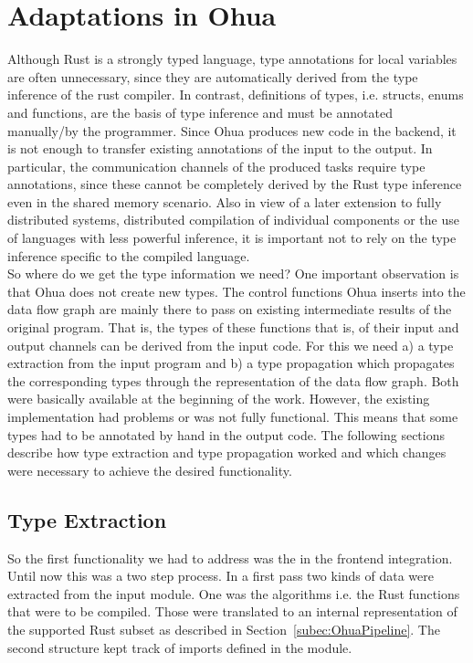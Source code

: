 \section{Adaptations in Ohua}

Although Rust is a strongly typed language, type annotations for local variables are often unnecessary, since they are automatically derived from the type inference of the rust compiler. In contrast, definitions of types, i.e. structs, enums and functions, are the basis of type inference and must be annotated manually/by the programmer. Since Ohua produces new code in the backend, it is not enough to transfer existing annotations of the input to the output. In particular, the communication channels of the produced tasks require type annotations, since these cannot be completely derived by the Rust type inference even in the shared memory scenario. Also in view of a later extension to fully distributed systems, distributed compilation of individual components or the use of languages with less powerful inference, it is important not to rely on the type inference specific to the compiled language. \\

So where do we get the type information we need? One important observation is that Ohua does not create new types. The control functions Ohua inserts into the data flow graph are mainly there to pass on existing intermediate results of the original program. That is, the types of these functions that is, of their input and output channels can be derived from the input code. For this we need a) a type extraction from the input program and b) a type propagation which propagates the corresponding types through the representation of the data flow graph. Both were basically available at the beginning of the work. However, the existing implementation had problems or was not fully functional. This means that some types had to be annotated by hand in the output code. The following sections describe how type extraction and type propagation worked and which changes were necessary to achieve the desired functionality. \\

\subsection{Type Extraction}
So the first functionality we had to address was the  in the frontend integration. Until now this was a two step process. In a first pass two kinds of data were extracted from the input module. One was the algorithms i.e. the Rust functions that were to be compiled. Those were translated to an internal representation of the supported Rust subset as described in Section~\ref{subec:OhuaPipeline}. The second structure kept track of imports defined in the module. \\

